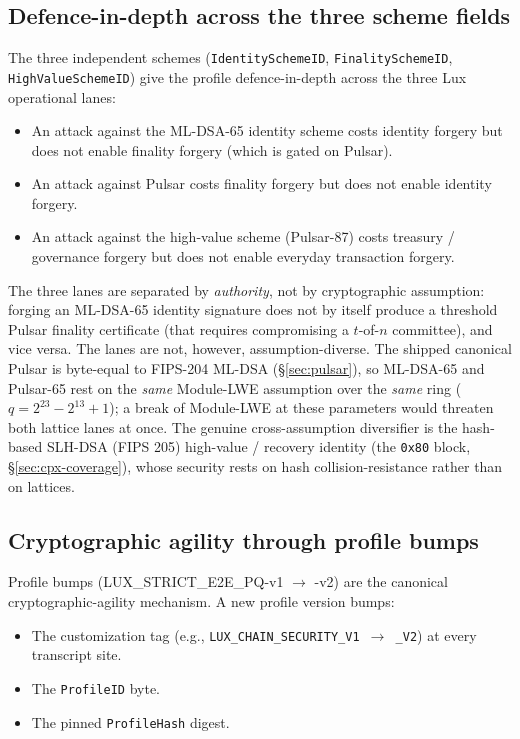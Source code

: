 \subsection{Defence-in-depth across the three scheme fields}

The three independent schemes (\texttt{IdentitySchemeID},
\texttt{FinalitySchemeID}, \texttt{HighValueSchemeID}) give the profile
defence-in-depth across the three Lux operational lanes:

\begin{itemize}[leftmargin=2em,nosep]
  \item An attack against the ML-DSA-65 identity scheme costs identity
    forgery but does not enable finality forgery (which is gated on
    Pulsar).
  \item An attack against Pulsar costs finality forgery but does not
    enable identity forgery.
  \item An attack against the high-value scheme (Pulsar-87) costs
    treasury / governance forgery but does not enable everyday
    transaction forgery.
\end{itemize}

The three lanes are separated by \emph{authority}, not by cryptographic
assumption: forging an ML-DSA-65 identity signature does not by itself
produce a threshold Pulsar finality certificate (that requires
compromising a $t$-of-$n$ committee), and vice versa. The lanes are not,
however, assumption-diverse. The shipped canonical Pulsar is byte-equal
to FIPS-204 ML-DSA (\S\ref{sec:pulsar}), so ML-DSA-65 and Pulsar-65 rest
on the \emph{same} Module-LWE assumption over the \emph{same} ring
($q = 2^{23}-2^{13}+1$); a break of Module-LWE at these parameters would
threaten both lattice lanes at once. The genuine cross-assumption
diversifier is the hash-based SLH-DSA (FIPS 205) high-value / recovery
identity (the \texttt{0x80} block, \S\ref{sec:cpx-coverage}), whose
security rests on hash collision-resistance rather than on lattices.

\subsection{Cryptographic agility through profile bumps}

Profile bumps (LUX\_STRICT\_E2E\_PQ-v1 $\to$ -v2) are the canonical
cryptographic-agility mechanism. A new profile version bumps:

\begin{itemize}[leftmargin=2em,nosep]
  \item The customization tag (e.g., \texttt{LUX\_CHAIN\_SECURITY\_V1 $\to$
    \_V2}) at every transcript site.
  \item The \texttt{ProfileID} byte.
  \item The pinned \texttt{ProfileHash} digest.
\end{itemize}

